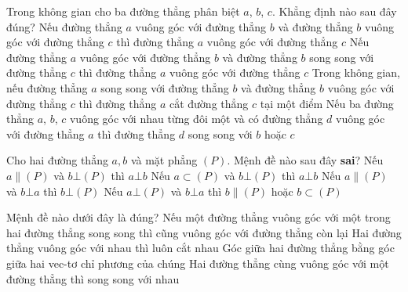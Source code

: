 \begin{ex}%
	Trong không gian cho ba đường  thẳng phân biệt $a$, $b$, $c$. Khẳng định nào sau đây đúng?
	 \choice
		{Nếu đường thẳng $a$ vuông góc với đường thẳng $b$ và đường thẳng $b$ vuông góc với đường thẳng $c$  thì đường thẳng $a$ vuông góc với đường thẳng $c$}
		{\True Nếu đường thẳng $a$ vuông góc với đường thẳng $b$ và đường thẳng $b$ song song  với đường thẳng $c$ thì đường thẳng $a$ vuông góc với đường thẳng $c$}
		{Trong không gian, nếu đường  thẳng $a$ song song với đường thẳng $b$ và đường thẳng $b$ vuông góc với đường thẳng $c$ thì đường thẳng $a$ cắt đường thẳng $c$ tại một điểm}
		{Nếu ba đường thẳng $a$, $b$, $c$ vuông góc với nhau từng đôi một và có đường thẳng  $d$ vuông góc với đường thẳng $a$ thì đường thẳng $d$ song song với $b$ hoặc $c$}
\end{ex}

\begin{ex}%
	Cho hai đường thẳng $a, b$ và mặt phẳng $(P)$. Mệnh đề  nào sau đây {\bf sai}?
	 \choice
		{Nếu $a\parallel (P)$ và $b\bot  (P)$ thì $a\bot b$}
		{Nếu $a\subset  (P)$ và $b\bot (P)$ thì $a\bot b$}
		{\True Nếu $a\parallel (P)$ và $b\bot a$ thì $b\bot (P)$} 
		{Nếu $a\bot (P)$ và $b\bot a$ thì $b\parallel (P)$ hoặc $b\subset (P)$} 
\end{ex}

\begin{ex}%
	Mệnh đề  nào dưới đây là đúng?
	 \choice
		{Nếu một đường thẳng vuông góc  với một trong hai đường thẳng song song thì cũng vuông góc với đường thẳng còn lại}
		{Hai đường thẳng vuông góc với nhau thì luôn  cắt nhau}
		{Góc giữa hai đường thẳng bằng góc giữa hai  vec-tơ chỉ phương của chúng}
		{\True Hai đường thẳng cùng vuông góc với một đường thẳng thì song song với  nhau}
\end{ex}


